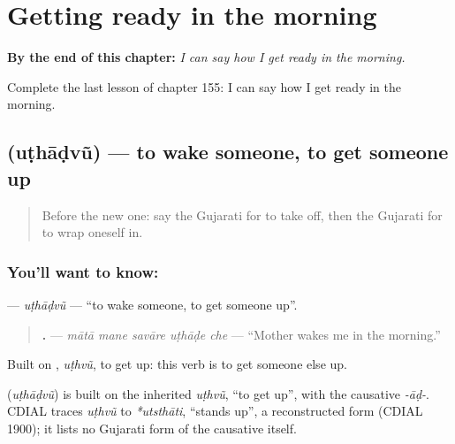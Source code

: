 
\chapter{Getting ready in the morning}
\label{ch:gu-getting-ready-in-the-morning}

\begin{chapteropening}
\textbf{By the end of this chapter:} \emph{I can say how I get ready in the morning.}

Complete the last lesson of chapter 155: I can say how I get ready in the morning.
\end{chapteropening}

\section[\texorpdfstring{\gu{ઉઠાડવું} (uṭhāḍvũ)}{ઉઠાડવું (uṭhāḍvũ)}]{ (uṭhāḍvũ) — to wake someone, to get someone up}

\label{lesson:GU-C155-uthadvu}



\begin{quote}
Before the new one: say the Gujarati for to take off, then the Gujarati for to wrap oneself in.
\end{quote}

\subsection*{You'll want to know: }
\textbf{} — \emph{uṭhāḍvũ} — \textquotedblleft{}to wake someone, to get someone up\textquotedblright{}.

\begin{quote}
\textbf{    .} — \emph{mātā mane savāre uṭhāḍe che} — \textquotedblleft{}Mother wakes me in the morning.\textquotedblright{}
\end{quote}

Built on \textbf{}, \emph{uṭhvũ}, to get up: this verb is to get someone else up.

\begin{cousinweb}
\textbf{} (\emph{uṭhāḍvũ}) is built on the inherited \emph{uṭhvũ}, \textquotedblleft{}to get up\textquotedblright{}, with the causative \emph{-āḍ-}. CDIAL traces \emph{uṭhvũ} to \emph{*utsthāti}, \textquotedblleft{}stands up\textquotedblright{}, a reconstructed form (CDIAL 1900); it lists no Gujarati form of the causative itself.
\end{cousinweb}

